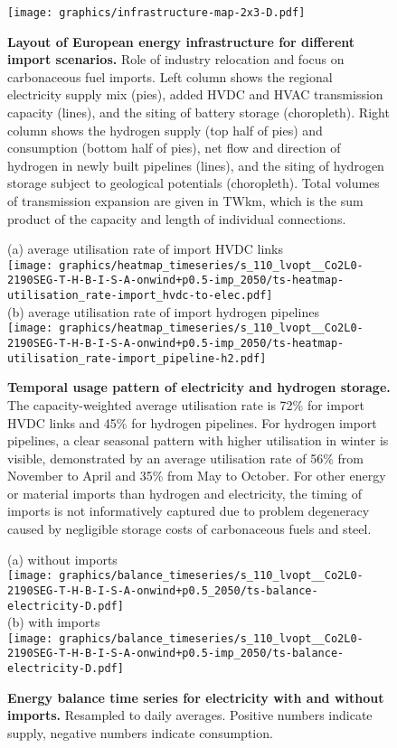 \documentclass[5p,10pt]{elsarticle}
\begin{document}
\begin{figure*}
    \texttt{[image: graphics/infrastructure-map-2x3-D.pdf]}
    \caption{\textbf{Layout of European energy infrastructure for different import scenarios.} Role of industry relocation and focus on carbonaceous fuel imports.
    Left column shows the regional electricity supply mix (pies), added HVDC and HVAC transmission capacity (lines), and the siting of battery storage (choropleth).
        Right column shows the hydrogen supply (top half of pies) and consumption (bottom half of pies), net flow and direction of hydrogen in newly built pipelines (lines), and the siting of hydrogen storage subject to geological potentials (choropleth).
        Total volumes of transmission expansion are given in TWkm, which is the sum product of the capacity and length of individual connections.
    }
    \label{fig:si:infra-d}
\end{figure*}



\begin{figure*}
    \centering
    \footnotesize
    (a) average utilisation rate of import HVDC links \\
    \texttt{[image: graphics/heatmap\_timeseries/s\_110\_lvopt\_\_Co2L0-2190SEG-T-H-B-I-S-A-onwind+p0.5-imp\_2050/ts-heatmap-utilisation\_rate-import\_hvdc-to-elec.pdf]} \\
    (b) average utilisation rate of import hydrogen pipelines \\
    \texttt{[image: graphics/heatmap\_timeseries/s\_110\_lvopt\_\_Co2L0-2190SEG-T-H-B-I-S-A-onwind+p0.5-imp\_2050/ts-heatmap-utilisation\_rate-import\_pipeline-h2.pdf]}
    \caption{\textbf{Temporal usage pattern of electricity and hydrogen storage.}
    The capacity-weighted average utilisation rate is 72\% for import HVDC links and 45\% for
    hydrogen pipelines. For hydrogen import pipelines, a clear seasonal pattern
    with higher utilisation in winter is visible, demonstrated by an average utilisation rate of 56\% from November to April and 35\% from May to October.
    For other energy or material
    imports than hydrogen and electricity, the timing of imports is not
    informatively captured due to problem degeneracy caused by negligible
    storage costs of carbonaceous fuels and steel.}
    \label{fig:si:import-operation}
\end{figure*}

\begin{figure*}
    \centering
    \footnotesize
    (a) without imports \\
    \texttt{[image: graphics/balance\_timeseries/s\_110\_lvopt\_\_Co2L0-2190SEG-T-H-B-I-S-A-onwind+p0.5\_2050/ts-balance-electricity-D.pdf]} \\
    (b) with imports \\
    \texttt{[image: graphics/balance\_timeseries/s\_110\_lvopt\_\_Co2L0-2190SEG-T-H-B-I-S-A-onwind+p0.5-imp\_2050/ts-balance-electricity-D.pdf]}
    \caption{\textbf{Energy balance time series for electricity with and without imports.} Resampled to daily averages. Positive numbers indicate supply, negative numbers indicate consumption.}
    \label{fig:si:balance-elec}
\end{figure*}
\end{document}
